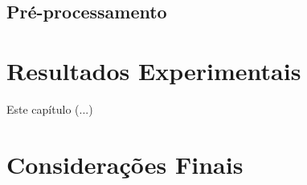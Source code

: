 \documentclass[12pt,oneside,a4paper,chapter=TITLE,section=TITLE,sumario
=tradicional]{abntex2}
\begin{document}
\section{Pré-processamento}


\chapter{Resultados Experimentais}
\label{cap:resultados}

Este capítulo (...)





\chapter{Considerações Finais}
\label{cap:conclusao}







\end{document}
